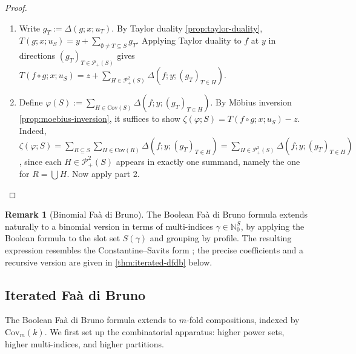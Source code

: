 \documentclass[10pt,a4paper]{article}
\theoremstyle{plain}
\theoremstyle{definition}
\newtheorem{remark}[theorem]{Remark}
\newcommand{\IN}{\mathbb{N}} %
\newcommand{\1}{\mathbb{1}} %
\newcommand{\KP}{\mathcal{P}}
\newcommand{\Cov}{\mathrm{Cov}} %
\begin{document}
\begin{proof}

\begin{enumerate}
\def\labelenumi{\arabic{enumi})}
\setcounter{enumi}{1}
\item
  Write \(g_T := \Delta(g; x; u_T)\). By Taylor duality
  \ref{prop:taylor-duality},
  \(T(g; x; u_S) = y + \sum_{\emptyset \neq T \subseteq S} g_T\).
  Applying Taylor duality to \(f\) at \(y\) in directions
  \((g_T)_{T \in \KP_+(S)}\) gives
  \(T(f \circ g; x; u_S) = z + \sum_{H \in \KP_+^2(S)} \Delta(f; y; (g_T)_{T \in H})\).
\item
  Define
  \(\varphi(S) := \sum_{H \in \Cov(S)} \Delta(f; y; (g_T)_{T \in H})\).
  By Möbius inversion \ref{prop:moebius-inversion}, it suffices to show
  \(\zeta(\varphi; S) = T(f \circ g; x; u_S) - z\). Indeed,
  \(\zeta(\varphi; S) = \sum_{R \subseteq S} \sum_{H \in \Cov(R)} \Delta(f; y; (g_T)_{T \in H}) = \sum_{H \in \KP_+^2(S)} \Delta(f; y; (g_T)_{T \in H})\),
  since each \(H \in \KP_+^2(S)\) appears in exactly one summand, namely
  the one for \(R = \bigcup H\). Now apply part 2.
\end{enumerate}

\end{proof}

\begin{remark}[Binomial Faà di Bruno]

The Boolean Faà di Bruno formula extends naturally to a binomial version
in terms of multi-indices \(\gamma \in \IN_0^S\), by applying the
Boolean formula to the slot set \(S(\gamma)\) and grouping by profile.
The resulting expression resembles the Constantine--Savits form
\citep{CS1996}; the precise coefficients and a recursive version are
given in \ref{thm:iterated-dfdb} below.

\end{remark}

\subsection{Iterated Faà di Bruno}\label{iterated-fauxe0-di-bruno}

The Boolean Faà di Bruno formula extends to \(m\)-fold compositions,
indexed by \(\Cov_m(k)\). We first set up the combinatorial apparatus:
higher power sets, higher multi-indices, and higher partitions.
\end{document}
